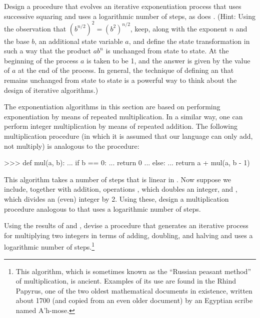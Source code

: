 \begin{exerciseGroup}
\label{Exercise 1.16}
 Design a procedure that evolves
an iterative exponentiation process that uses successive squaring and uses a
logarithmic number of steps, as does .  (Hint: Using the
observation that \( (b^{n / 2})^2 = (b^2)^{n / 2} \), keep, along with
the exponent \( n \) and the base \( b \), an additional state variable \( a \), and
define the state transformation in such a way that the product \( ab^n \)
is unchanged from state to state.  At the beginning of the process
\( a \) is taken to be 1, and the answer is given by the value of \( a \) at the
end of the process.  In general, the technique of defining an
 that remains unchanged from state to state is a
powerful way to think about the design of iterative algorithms.)

\label{Exercise 1.17}
 The exponentiation algorithms in
this section are based on performing exponentiation by means of repeated
multiplication.  In a similar way, one can perform integer multiplication by
means of repeated addition.  The following multiplication procedure (in which
it is assumed that our language can only add, not multiply) is analogous to the
 procedure:

\begin{codeBlock}
>>> def mul(a, b):
...     if b == 0:
...         return 0
...     else:
...         return a + mul(a, b - 1)
\end{codeBlock}

This algorithm takes a number of steps that is linear in .  Now suppose
we include, together with addition, operations , which doubles an
integer, and , which divides an (even) integer by 2.  Using these,
design a multiplication procedure analogous to  that uses a
logarithmic number of steps.

\label{Exercise 1.18}
 Using the results of
 and , devise a procedure that generates
an iterative process for multiplying two integers in terms of adding, doubling,
and halving and uses a logarithmic number of steps.\footnote{This algorithm,
which is sometimes known as the ``Russian peasant method'' of multiplication,
is ancient.  Examples of its use are found in the Rhind Papyrus, one of the two
oldest mathematical documents in existence, written about 1700 
(and copied from an even older document) by an Egyptian scribe named A\( \! \)'h-mose.}


\end{exerciseGroup}
